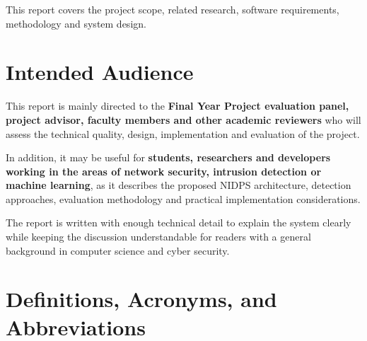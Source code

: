 \noindent This report covers the project scope, related research, software requirements, methodology and system design.

\section{Intended Audience}\label{sec:1.2}

\noindent This report is mainly directed to the \textbf{Final Year Project evaluation panel, project advisor, faculty members and other academic reviewers} who will assess the technical quality, design, implementation and evaluation of the project.

\noindent In addition, it may be useful for \textbf{students, researchers and developers working in the areas of network security, intrusion detection or machine learning}, as it describes the proposed NIDPS architecture, detection approaches, evaluation methodology and practical implementation considerations.

\noindent The report is written with enough technical detail to explain the system clearly while keeping the discussion understandable for readers with a general background in computer science and cyber security.

\section{Definitions, Acronyms, and Abbreviations}\label{sec:1.3}

